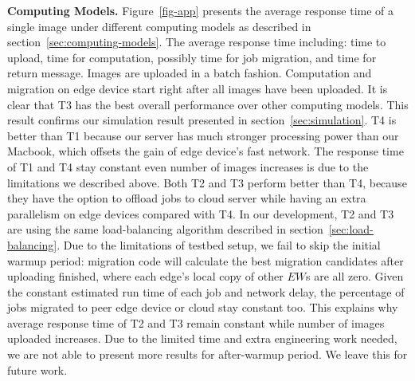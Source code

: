 

\hfill\break
\noindent \textbf{Computing Models.}
Figure~\ref{fig-app} presents the average response time of a single image under different
computing models as described in section~\ref{sec:computing-models}. The average response time including: time to upload,
time for computation, possibly time for job migration, and time for return message.
Images are uploaded in a batch fashion. Computation and migration on edge device start
right after all images have been uploaded. It is clear that T3 has the best overall performance
over other computing models. This result confirms our simulation result presented in section~\ref{sec:simulation}.
T4 is better than T1 because our server has much stronger processing power than our Macbook,
which offsets the gain of edge device's fast network.
The response time of T1 and T4 stay constant even number of images increases is due to the
limitations we described above. Both T2 and T3 perform better than T4, because they have the option to
offload jobs to cloud server while having an extra parallelism on edge devices compared with T4.
In our development, T2 and T3 are using the same load-balancing algorithm described
in section~\ref{sec:load-balancing}. Due to the limitations of testbed setup, we fail to skip the
initial warmup period: migration code will calculate the best migration candidates after uploading finished,
where each edge's local copy of other \(EW\)s are all zero. Given the constant estimated run time of each job and network delay,
the percentage of jobs migrated to peer edge device or cloud stay constant too.
This explains why average response time of T2 and T3 remain constant while number of images uploaded increases.
Due to the limited time and extra engineering work needed, we are not able to present more results for after-warmup period.
We leave this for future work.

